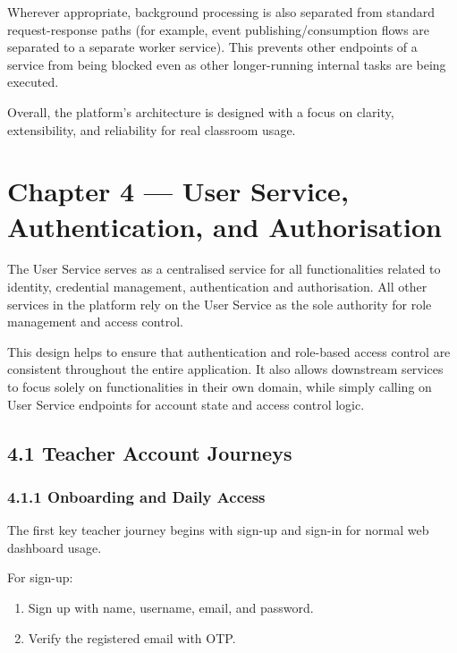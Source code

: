 \documentclass[
  12pt,
  a4paper,
]{report}
\providecommand{\tightlist}{%
  \setlength{\itemsep}{0pt}\setlength{\parskip}{0pt}}
\begin{document}
Wherever appropriate, background processing is also separated from
standard request-response paths (for example, event
publishing/consumption flows are separated to a separate worker
service). This prevents other endpoints of a service from being blocked
even as other longer-running internal tasks are being executed.

Overall, the platform's architecture is designed with a focus on
clarity, extensibility, and reliability for real classroom usage.


\hypertarget{chapter-4-user-service-authentication-and-authorisation}{%
\chapter{Chapter 4 --- User Service, Authentication, and
Authorisation}\label{chapter-4-user-service-authentication-and-authorisation}}

The User Service serves as a centralised service for all functionalities
related to identity, credential management, authentication and
authorisation. All other services in the platform rely on the User
Service as the sole authority for role management and access control.

This design helps to ensure that authentication and role-based access
control are consistent throughout the entire application. It also allows
downstream services to focus solely on functionalities in their own
domain, while simply calling on User Service endpoints for account state
and access control logic.

\hypertarget{account-models}{%
\section{4.1 Teacher Account Journeys}\label{account-models}}

\hypertarget{teacher-accounts-and-verification}{%
\subsection{4.1.1 Onboarding and Daily
Access}\label{teacher-accounts-and-verification}}

The first key teacher journey begins with sign-up and sign-in for normal
web dashboard usage.

For sign-up:
\begin{enumerate}
\def\labelenumi{\arabic{enumi}.}
\tightlist
\item
  Sign up with name, username, email, and password.
\item
  Verify the registered email with OTP.
\end{enumerate}
\end{document}
